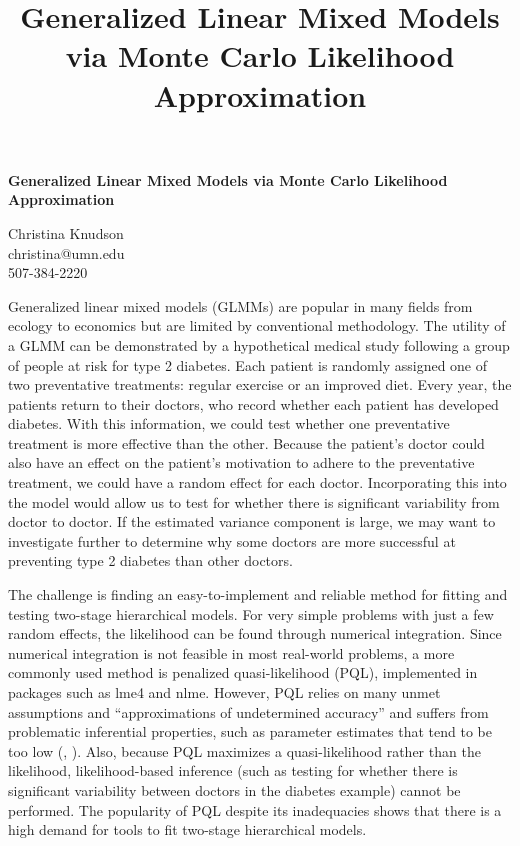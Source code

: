 \documentclass[12pt]{article}
\title{Generalized Linear Mixed Models via Monte Carlo Likelihood Approximation}
\author{}
\date{}
\newcommand{\ncite}[1]{\citeauthor{#1}, \citeyear{#1}}
\begin{document}
 \centerline{\large \bf Generalized Linear Mixed Models via Monte Carlo Likelihood Approximation} %

 \medskip

 \centerline{Christina Knudson\\
christina@umn.edu\\
507-384-2220}
 \smallskip

Generalized linear mixed models (GLMMs) are popular in many fields from ecology to economics but are limited by conventional methodology. The utility of a GLMM can be demonstrated by a hypothetical medical study following a group of people at risk for type 2 diabetes. Each patient is randomly assigned one of two preventative treatments: regular exercise or an improved diet. Every year, the patients return to their doctors, who record  whether each patient has developed diabetes. With this information, we could test whether one preventative treatment is more effective than the other.  Because the patient's doctor could also have an effect on the patient's motivation to adhere to the preventative treatment, we could have a random effect for each doctor. Incorporating this into the model would allow us to test for whether there is significant variability from doctor to doctor.  If the estimated variance component is large, we may want to investigate further to determine why some doctors are more successful at preventing type 2 diabetes than other doctors.


The challenge is finding an easy-to-implement and reliable method for fitting and testing two-stage hierarchical models. For very simple problems with just a few random effects, the likelihood can be found through numerical integration. Since numerical integration is not feasible in most real-world problems, a more commonly used method is penalized quasi-likelihood (PQL), implemented in packages such as lme4 and nlme. However, PQL relies on many unmet assumptions and ``approximations of undetermined accuracy'' and suffers from problematic inferential properties, such as parameter estimates that tend to be too low (\ncite{mccu:sear:2001}). Also, because PQL maximizes a quasi-likelihood rather than the likelihood, likelihood-based inference (such as testing for whether there is significant variability between doctors in the diabetes example) cannot be performed.  The popularity of PQL despite its inadequacies shows that there is a high demand for tools to fit two-stage hierarchical models.
\end{document}
